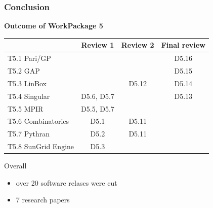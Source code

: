 \documentclass{beamer}
\begin{document}
    



\begin{frame}
  \frametitle{Conclusion}

  \textbf{Outcome of WorkPackage 5}
  \begin{center}
{\small
    \begin{tabular}{lccc}
    \toprule
        & Review 1 & Review 2 & Final review\\
    \midrule
    T5.1 Pari/GP & & & {\color{green} D5.16} \\
    T5.2 GAP     & & & {\color{green} D5.15} \\
    T5.3 LinBox  & & \alert{D5.12} & {\color{green} D5.14} \\
    T5.4 Singular& D5.6, D5.7 & & {\color{green} D5.13} \\
    T5.5 MPIR    & D5.5, D5.7& & \\
    T5.6 Combinatorics  & D5.1& \alert{D5.11} & \\
    T5.7 Pythran        & D5.2 & \alert{D5.11} & \\
    T5.8 SunGrid Engine & D5.3 & & \\
    \bottomrule
    
  \end{tabular}
}
  \end{center}
  
  Overall
  \begin{itemize}
  \item over 20 software relases were cut
  \item 7 research papers
  \end{itemize}
\end{frame}
  
\end{document}
